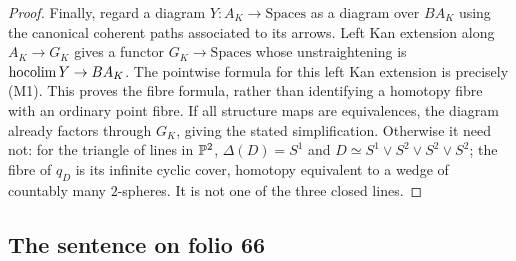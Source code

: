 \begin{proof}
Finally, regard a diagram $Y:A_K\to\mathrm{Spaces}$ as a diagram over $BA_K$ using the canonical coherent paths associated to its arrows.  Left Kan extension along $A_K\to G_K$ gives a functor $G_K\to\mathrm{Spaces}$ whose unstraightening is $\operatorname{hocolim} Y\to BA_K$.  The pointwise formula for this left Kan extension is precisely (M1).  This proves the fibre formula, rather than identifying a homotopy fibre with an ordinary point fibre.  If all structure maps are equivalences, the diagram already factors through $G_K$, giving the stated simplification.  Otherwise it need not: for the triangle of lines in $\mathbb P^2$, $\Delta(D)=S^1$ and $D\simeq S^1\vee S^2\vee S^2\vee S^2$; the fibre of $q_D$ is its infinite cyclic cover, homotopy equivalent to a wedge of countably many $2$-spheres.  It is not one of the three closed lines.
\end{proof}

\subsection{The sentence on folio 66}

